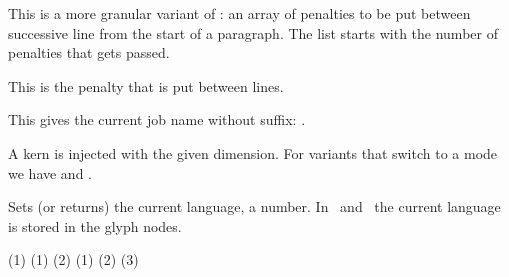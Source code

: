 %

\stopoldprimitive

\startoldprimitive[title={\prm {interlinepenalties}}]

This is a more granular variant of : an array of penalties
to be put between successive line from the start of a paragraph. The list starts
with the number of penalties that gets passed.

\stopoldprimitive

\startoldprimitive[title={\prm {interlinepenalty}}]

This is the penalty that is put between lines.

\stopoldprimitive

\startoldprimitive[title={\prm {jobname}}]

This gives the current job name without suffix: {\tttf \jobname}.

\stopoldprimitive

\startoldprimitive[title={\prm {kern}}]

A kern is injected with the given dimension. For variants that switch to a mode
we have  and .

\stopoldprimitive

\startoldprimitive[title={\prm {language}}]

Sets (or returns) the current language, a number. In \LUATEX\ and \LUAMETATEX\
the current language is stored in the glyph nodes.

\stopoldprimitive

\startnewprimitive[title={\prm {lastarguments}}]

\startbuffer
\def\MyMacro    #1{\the\lastarguments (#1) }          \MyMacro{1}       \crlf
\def\MyMacro  #1#2{\the\lastarguments (#1) (#2)}      \MyMacro{1}{2}    \crlf
\def\MyMacro#1#2#3{\the\lastarguments (#1) (#2) (#3)} \MyMacro{1}{2}{3} \par

